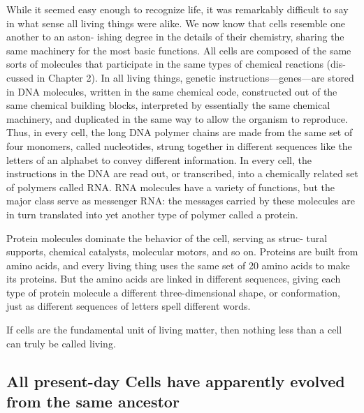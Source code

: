 While it seemed easy enough to recognize life, it was remarkably difficult to
say in what sense all living things were alike.
We now know that cells resemble one another to an aston-
ishing degree in the details of their chemistry, sharing the same machinery
for the most basic functions. All cells are composed of the same sorts of
molecules that participate in the same types of chemical reactions (dis-
cussed in Chapter 2). In all living things, genetic instructions—genes—are
stored in DNA molecules, written in the same chemical code, constructed
out of the same chemical building blocks, interpreted by essentially the
same chemical machinery, and duplicated in the same way to allow the
organism to reproduce. Thus, in every cell, the long DNA polymer chains
are made from the same set of four monomers, called nucleotides, strung
together in different sequences like the letters of an alphabet to convey
different information. In every cell, the instructions in the DNA are read
out, or transcribed, into a chemically related set of polymers called RNA.
RNA molecules have a variety of functions, but the major
class serve as messenger RNA: the messages carried by these molecules
are in turn translated into yet another type of polymer called a protein.

Protein molecules dominate the behavior of the cell, serving as struc-
tural supports, chemical catalysts, molecular motors, and so on. Proteins
are built from amino acids, and every living thing uses the same set of
20 amino acids to make its proteins. But the amino acids are linked in
different sequences, giving each type of protein molecule a different
three-dimensional shape, or conformation, just as different sequences
of letters spell different words.

If cells are the fundamental unit of living matter, then nothing less than a
cell can truly be called living.

\subsection{All present-day Cells have apparently evolved from the same ancestor}

